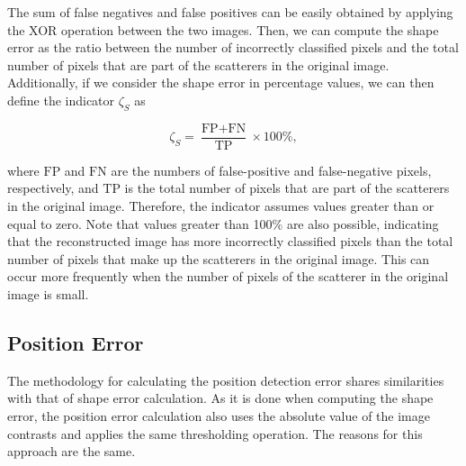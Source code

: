 \documentclass{IEEEtran}
\begin{document}
            The sum of false negatives and false positives can be easily obtained by applying the XOR operation between the two images. Then, we can compute the shape error as the ratio between the number of incorrectly classified pixels and the total number of pixels that are part of the scatterers in the original image. Additionally, if we consider the shape error in percentage values, we can then define the indicator $\zeta_S$ as

            \begin{equation}
                \zeta_S = \frac{\text{FP} + \text{FN}}{\text{TP}} \times 100\%, \label{eq:shapeerror}
            \end{equation}

            \noindent where $\text{FP}$ and $\text{FN}$ are the numbers of false-positive and false-negative pixels, respectively, and $\text{TP}$ is the total number of pixels that are part of the scatterers in the original image. Therefore, the indicator assumes values greater than or equal to zero. Note that values greater than 100\% are also possible, indicating that the reconstructed image has more incorrectly classified pixels than the total number of pixels that make up the scatterers in the original image. This can occur more frequently when the number of pixels of the scatterer in the original image is small.
			
		\subsection{Position Error}\label{sec:indicators:positionerror}


            The methodology for calculating the position detection error shares similarities with that of shape error calculation. As it is done when computing the shape error, the position error calculation also uses the absolute value of the image contrasts and applies the same thresholding operation. The reasons for this approach are the same.
            
\end{document}

